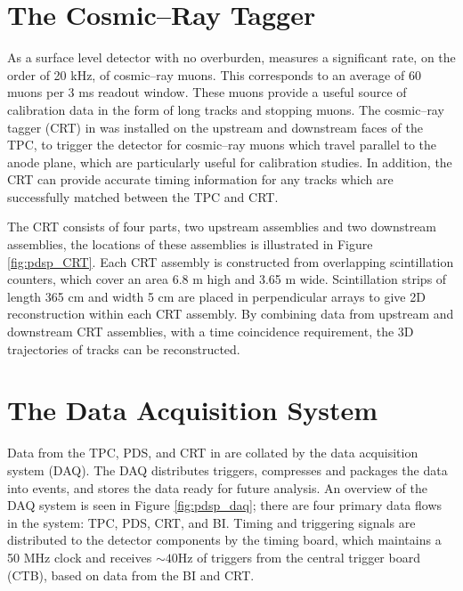 \section{The Cosmic--Ray Tagger} \label{sec:pdsp_cosmic}

As a surface level detector with no overburden, \protodune{} measures a
significant rate, on the order of 20 kHz, of cosmic--ray muons. This corresponds
to an average of 60 muons per 3 ms readout window. These muons provide a 
useful source of calibration data in the form of long tracks and stopping 
muons. The cosmic--ray tagger (CRT) in \protodune{} was installed on the 
upstream and downstream faces of the TPC, to trigger the detector for 
cosmic--ray muons which travel parallel to the anode plane, which are
particularly useful for calibration studies. In addition, the CRT can provide 
accurate timing information for any tracks which are successfully matched 
between the TPC and CRT.

The CRT consists of four parts, two upstream assemblies and two downstream
assemblies, the locations of these assemblies is illustrated in Figure
\ref{fig:pdsp_CRT}. Each CRT assembly is constructed from overlapping 
scintillation counters, which cover an area 6.8 m high and 3.65 m wide. 
Scintillation strips of length 365 cm and width 5 cm are placed in 
perpendicular arrays to give 2D reconstruction within each CRT 
assembly. By combining data from upstream and downstream CRT assemblies, with a 
time coincidence requirement, the 3D trajectories of tracks can be 
reconstructed.

\section{The Data Acquisition System} \label{sec:pdsp_daq}

Data from the TPC, PDS, and CRT in \protodune{} are collated by the data 
acquisition system (DAQ). The DAQ distributes triggers, compresses and packages 
the data into events, and stores the data ready for future analysis. 
An overview of the \protodune{} DAQ system is seen in Figure 
\ref{fig:pdsp_daq}; there are four primary data flows in the system: TPC, PDS, 
CRT, and BI. Timing and triggering signals are distributed to the detector 
components by the timing board, which maintains a 50 MHz clock and receives 
$\sim 40 \mbox{Hz}$ of triggers from the central trigger board (CTB), based on 
data from the BI and CRT\cite{Abi:2017aow}.

